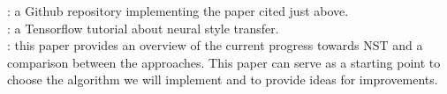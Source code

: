 \documentclass[twocolumn,superscriptaddress,aps]{revtex4-1}
\begin{document}
    \cite{github-neural-style-transfer} : a Github repository implementing the paper cited just above.\\
    
    \cite{tensorflow-style-transfer} : a Tensorflow tutorial about neural style transfer.\\
    
    \cite{1705-04058} : this paper provides an overview of the current progress towards NST and a comparison between the approaches. This paper can serve as a starting point to choose the algorithm we will implement and to provide ideas for improvements.
    
    
    
\end{document}
